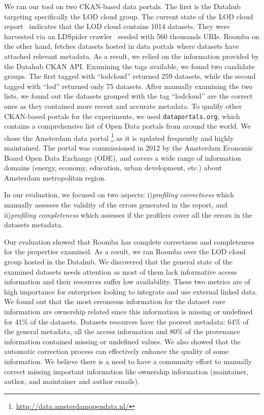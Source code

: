 \documentclass[a4paper,11pt,twoside]{ThesisStyle}
\begin{document}
We ran our tool on two CKAN-based data portals. The first is the Datahub targeting specifically the LOD cloud group. The current state of the LOD cloud report~\cite{Schmachtenberg:ISWC:14} indicates that the LOD cloud contains 1014 datasets. They were harvested via an LDSpider crawler~\cite{Isele:ISWC:10} seeded with 560 thousands URIs. Roomba on the other hand, fetches datasets hosted in data portals where datasets have attached relevant metadata. As a result, we relied on the information provided by the Datahub CKAN API. Examining the tags available, we found two candidate groups. The first tagged with ``lodcloud'' returned 259 datasets, while the second tagged with ``lod'' returned only 75 datasets. After manually examining the two lists, we found out the datasets grouped with the tag ``lodcloud'' are the correct ones as they contained more recent and accurate metadata. To qualify other CKAN-based portals for the experiments, we used \texttt{dataportals.org}, which contains a comprehensive list of Open Data portals from around the world. We chose the Amsterdam data portal \footnote{\url{http://data.amsterdamopendata.nl/}} as it is updated frequently and highly maintained. The portal was commissioned in 2012 by the Amsterdam Economic Board Open Data Exchange (ODE), and covers a wide range of information domains (energy, economy, education, urban development, etc.) about Amsterdam metropolitan region.

In our evaluation, we focused on two aspects: i)\textit{profiling correctness} which manually assesses the validity of the errors generated in the report, and ii)\textit{profiling completeness} which assesses if the profilers cover all the errors in the datasets metadata.

Our evaluation showed that Roomba has complete correctness and completeness for the properties examined. As a result, we ran Roomba over the LOD cloud group hosted in the Datahub. We discovered that the general state of the examined datasets needs attention as most of them lack informative access information and their resources suffer low availability. These two metrics are of high importance for enterprises looking to integrate and use external linked data. We found out that the most erroneous information for the dataset core information are ownership related since this information is missing or undefined for 41\% of the datasets. Datasets resources have the poorest metadata: 64\% of the general metadata, all the access information and 80\% of the provenance information contained missing or undefined values. We also showed that the automatic correction process can effectively enhance the quality of some information. We believe there is a need to have a community effort to manually correct missing important information like ownership information (maintainer, author, and maintainer and author emails).
\end{document}
